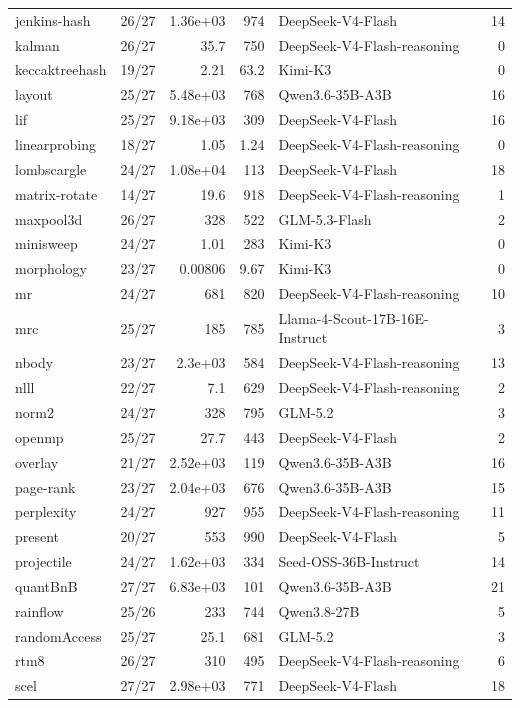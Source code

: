 \begin{longtable}{l r r r l r}
jenkins-hash & 26/27 & 1.36e+03 & 974 & DeepSeek-V4-Flash & 14 \\
kalman & 26/27 & 35.7 & 750 & DeepSeek-V4-Flash-reasoning & 0 \\
keccaktreehash & 19/27 & 2.21 & 63.2 & Kimi-K3 & 0 \\
layout & 25/27 & 5.48e+03 & 768 & Qwen3.6-35B-A3B & 16 \\
lif & 25/27 & 9.18e+03 & 309 & DeepSeek-V4-Flash & 16 \\
linearprobing & 18/27 & 1.05 & 1.24 & DeepSeek-V4-Flash-reasoning & 0 \\
lombscargle & 24/27 & 1.08e+04 & 113 & DeepSeek-V4-Flash & 18 \\
matrix-rotate & 14/27 & 19.6 & 918 & DeepSeek-V4-Flash-reasoning & 1 \\
maxpool3d & 26/27 & 328 & 522 & GLM-5.3-Flash & 2 \\
minisweep & 24/27 & 1.01 & 283 & Kimi-K3 & 0 \\
morphology & 23/27 & 0.00806 & 9.67 & Kimi-K3 & 0 \\
mr & 24/27 & 681 & 820 & DeepSeek-V4-Flash-reasoning & 10 \\
mrc & 25/27 & 185 & 785 & Llama-4-Scout-17B-16E-Instruct & 3 \\
nbody & 23/27 & 2.3e+03 & 584 & DeepSeek-V4-Flash-reasoning & 13 \\
nlll & 22/27 & 7.1 & 629 & DeepSeek-V4-Flash-reasoning & 2 \\
norm2 & 24/27 & 328 & 795 & GLM-5.2 & 3 \\
openmp & 25/27 & 27.7 & 443 & DeepSeek-V4-Flash & 2 \\
overlay & 21/27 & 2.52e+03 & 119 & Qwen3.6-35B-A3B & 16 \\
page-rank & 23/27 & 2.04e+03 & 676 & Qwen3.6-35B-A3B & 15 \\
perplexity & 24/27 & 927 & 955 & DeepSeek-V4-Flash-reasoning & 11 \\
present & 20/27 & 553 & 990 & DeepSeek-V4-Flash & 5 \\
projectile & 24/27 & 1.62e+03 & 334 & Seed-OSS-36B-Instruct & 14 \\
quantBnB & 27/27 & 6.83e+03 & 101 & Qwen3.6-35B-A3B & 21 \\
rainflow & 25/26 & 233 & 744 & Qwen3.8-27B & 5 \\
randomAccess & 25/27 & 25.1 & 681 & GLM-5.2 & 3 \\
rtm8 & 26/27 & 310 & 495 & DeepSeek-V4-Flash-reasoning & 6 \\
scel & 27/27 & 2.98e+03 & 771 & DeepSeek-V4-Flash & 18 \\

\end{longtable}
